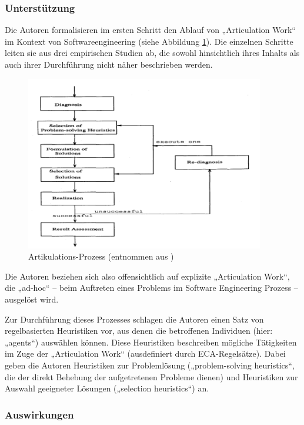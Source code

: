 \subsubsection{Unterstützung}

Die Autoren formalisieren im ersten Schritt den Ablauf von „Articulation Work“ im Kontext von Softwareengineering (siehe Abbildung \ref{fig:img_ArticulationWork_mi91-awprocess}). Die einzelnen Schritte leiten sie aus drei empirischen Studien ab, die sowohl hinsichtlich ihres Inhalts als auch ihrer Durchführung nicht näher beschrieben werden.

\begin{figure}[htbp]
	\centering
		\includegraphics[height=3in]{img/ArticulationWork/mi91-awprocess.png}
	\caption[Artikulations-Prozess]{Artikulations-Prozess (entnommen aus \citep{Mi91})}
	\label{fig:img_ArticulationWork_mi91-awprocess}
\end{figure}

Die Autoren beziehen sich also offensichtlich auf explizite „Articulation Work“, die „ad-hoc“ -- beim Auftreten eines Problems im Software Engineering Prozess -- ausgelöst wird.

Zur Durchführung dieses Prozesses schlagen die Autoren einen Satz von regelbasierten Heuristiken vor, aus denen die betroffenen Individuen (hier: „agents“) auswählen können. Diese Heuristiken beschreiben mögliche Tätigkeiten im Zuge der „Articulation Work“ (ausdefiniert durch \gls{ECA}-Regelsätze). Dabei geben die Autoren Heuristiken zur Problemlösung („problem-solving heuristics“, die der direkt Behebung der aufgetretenen Probleme dienen) und Heuristiken zur Auswahl geeigneter Lösungen („selection heuristics“) an.

\subsubsection{Auswirkungen}

